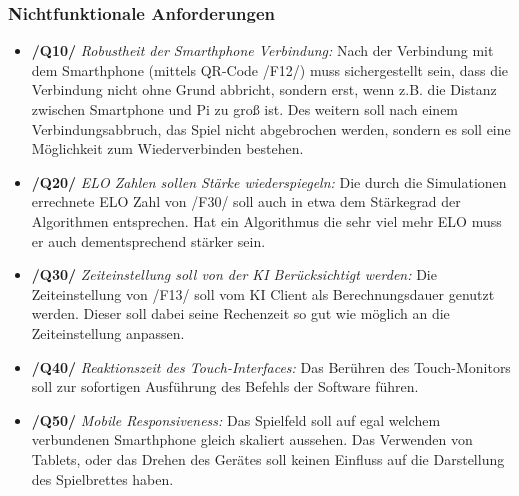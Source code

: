 \documentclass[12pt,a4paper,bibliography=totocnumbered,listof=totocnumbered]{article}
\begin{document}
\begin{appendix}
\begin{itemize}
\end{itemize}
\subsubsection{Nichtfunktionale Anforderungen}
\begin{itemize}
    \item \textbf{/Q10/} \textit{Robustheit der Smarthphone Verbindung:} Nach der Verbindung mit dem Smarthphone (mittels QR-Code /F12/) muss sichergestellt sein, dass die Verbindung nicht ohne
        Grund abbricht, sondern erst, wenn z.B. die Distanz zwischen Smartphone und Pi zu groß ist. Des weitern soll nach einem Verbindungsabbruch, 
        das Spiel nicht abgebrochen werden, sondern es soll eine Möglichkeit zum Wiederverbinden bestehen.
    \item \textbf{/Q20/} \textit{ELO Zahlen sollen Stärke wiederspiegeln:} Die durch die Simulationen errechnete ELO Zahl von /F30/ soll auch in etwa dem Stärkegrad der Algorithmen entsprechen.
        Hat ein Algorithmus die sehr viel mehr ELO muss er auch dementsprechend stärker sein.
    \item \textbf{/Q30/} \textit{Zeiteinstellung soll von der KI Berücksichtigt werden:} Die Zeiteinstellung von /F13/ soll vom KI Client als Berechnungsdauer genutzt werden.
        Dieser soll dabei seine Rechenzeit so gut wie möglich an die Zeiteinstellung anpassen.
    \item \textbf{/Q40/} \textit{Reaktionszeit des Touch-Interfaces:} Das Berühren des Touch-Monitors soll zur sofortigen Ausführung des Befehls der Software führen.
    \item \textbf{/Q50/} \textit{Mobile Responsiveness:} Das Spielfeld soll auf egal welchem verbundenen Smarthphone gleich skaliert aussehen. 
        Das Verwenden von Tablets, oder das Drehen des Gerätes soll keinen Einfluss auf die Darstellung des Spielbrettes haben.
\end{itemize}

\end{appendix}
\end{document}
